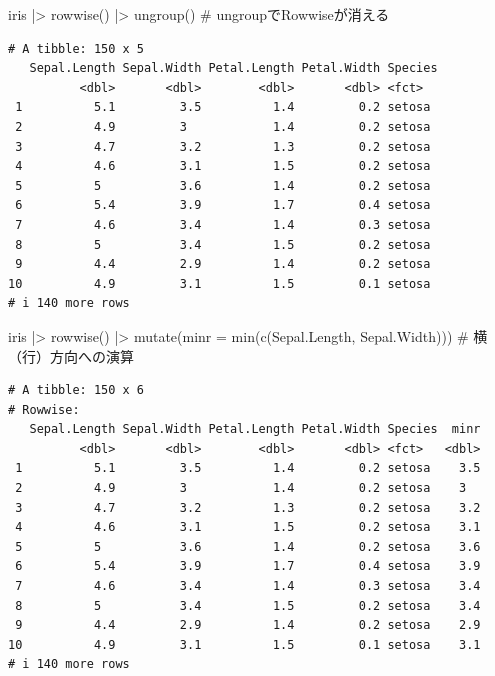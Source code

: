\documentclass[
  letterpaper,
  DIV=11,
  numbers=noendperiod]{scrreprt}
\newenvironment{Shaded}{\begin{snugshade}}{\end{snugshade}}
\newcommand{\AttributeTok}[1]{\textcolor[rgb]{0.40,0.45,0.13}{#1}}
\newcommand{\CommentTok}[1]{\textcolor[rgb]{0.37,0.37,0.37}{#1}}
\newcommand{\FunctionTok}[1]{\textcolor[rgb]{0.28,0.35,0.67}{#1}}
\newcommand{\NormalTok}[1]{\textcolor[rgb]{0.00,0.23,0.31}{#1}}
\newcommand{\SpecialCharTok}[1]{\textcolor[rgb]{0.37,0.37,0.37}{#1}}
\begin{document}
\begin{Shaded}
\begin{Highlighting}[]
\NormalTok{iris }\SpecialCharTok{|\textgreater{}} \FunctionTok{rowwise}\NormalTok{() }\SpecialCharTok{|\textgreater{}} \FunctionTok{ungroup}\NormalTok{() }\CommentTok{\# ungroupでRowwiseが消える}
\end{Highlighting}
\end{Shaded}

\begin{verbatim}
# A tibble: 150 x 5
   Sepal.Length Sepal.Width Petal.Length Petal.Width Species
          <dbl>       <dbl>        <dbl>       <dbl> <fct>  
 1          5.1         3.5          1.4         0.2 setosa 
 2          4.9         3            1.4         0.2 setosa 
 3          4.7         3.2          1.3         0.2 setosa 
 4          4.6         3.1          1.5         0.2 setosa 
 5          5           3.6          1.4         0.2 setosa 
 6          5.4         3.9          1.7         0.4 setosa 
 7          4.6         3.4          1.4         0.3 setosa 
 8          5           3.4          1.5         0.2 setosa 
 9          4.4         2.9          1.4         0.2 setosa 
10          4.9         3.1          1.5         0.1 setosa 
# i 140 more rows
\end{verbatim}

\begin{Shaded}
\begin{Highlighting}[]
\NormalTok{iris }\SpecialCharTok{|\textgreater{}} \FunctionTok{rowwise}\NormalTok{() }\SpecialCharTok{|\textgreater{}} \FunctionTok{mutate}\NormalTok{(}\AttributeTok{minr =} \FunctionTok{min}\NormalTok{(}\FunctionTok{c}\NormalTok{(Sepal.Length, Sepal.Width))) }\CommentTok{\# 横（行）方向への演算}
\end{Highlighting}
\end{Shaded}

\begin{verbatim}
# A tibble: 150 x 6
# Rowwise: 
   Sepal.Length Sepal.Width Petal.Length Petal.Width Species  minr
          <dbl>       <dbl>        <dbl>       <dbl> <fct>   <dbl>
 1          5.1         3.5          1.4         0.2 setosa    3.5
 2          4.9         3            1.4         0.2 setosa    3  
 3          4.7         3.2          1.3         0.2 setosa    3.2
 4          4.6         3.1          1.5         0.2 setosa    3.1
 5          5           3.6          1.4         0.2 setosa    3.6
 6          5.4         3.9          1.7         0.4 setosa    3.9
 7          4.6         3.4          1.4         0.3 setosa    3.4
 8          5           3.4          1.5         0.2 setosa    3.4
 9          4.4         2.9          1.4         0.2 setosa    2.9
10          4.9         3.1          1.5         0.1 setosa    3.1
# i 140 more rows
\end{verbatim}
\end{document}
